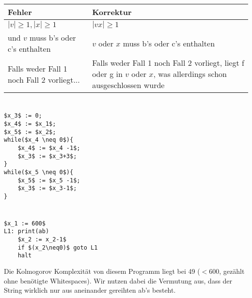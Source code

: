 \documentclass{article}
\begin{document}
\section{}
\begin{tabularx}{\textwidth}{X|X}
Fehler & Korrektur \\
\hline
$|v|\geq 1, |x| \geq 1$ & $|vx| \geq 1$\\
und $v$ muss b's oder c's enthalten & $v$ oder $x$ muss b's oder c's enthalten\\
Falls weder Fall 1 noch Fall 2 vorliegt... & Falls weder Fall 1 noch Fall 2 vorliegt, liegt f oder g in $v$ oder $x$, was allerdings schon ausgeschlossen wurde
\end{tabularx}

\section{}

\section{}
\begin{lstlisting}[mathescape]
$x_3$ := 0;
$x_4$ := $x_1$;
$x_5$ := $x_2$;
while($x_4 \neq 0$){
    $x_4$ := $x_4 -1$;
    $x_3$ := $x_3+3$;
}
while($x_5 \neq 0$){
    $x_5$ := $x_5 -1$;
    $x_3$ := $x_3-1$;
}
\end{lstlisting}

\section{}
\begin{lstlisting}[mathescape]
    $x_1 := 600$
L1: print(ab)
    $x_2 := x_2-1$
    if $(x_2\neq0)$ goto L1
    halt
\end{lstlisting}
Die Kolmogorov Komplexität von diesem Programm liegt bei 49 ($<600$, gezählt ohne benötigte Whitespaces). Wir nutzen dabei die Vermutung aus, dass der String wirklich nur aus aneinander gereihten ab's besteht.
\end{document}
